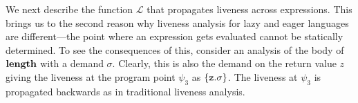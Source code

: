 \documentclass[9pt]{sigplanconf}
\newcommand{\comment}[1]{{\color{Myblue}{(#1)}}}
\begin{document}
We next  describe the function $\mathcal{L}$  that propagates liveness
across  expressions.   This brings  us  to  the  second reason why 
liveness analysis for lazy and eager languages are different---the
point  where  an  expression   gets  evaluated  cannot  be  statically
determined.   %
To see  the consequences of this, consider  an analysis  of the body  of $\mathbf{length}$  with a
demand $\sigma$.  Clearly, this is also the demand on the return value
$z$   giving  the   liveness  at   the  program   point   $\psi_3$  as
$\{\mbox{\tt z}.\sigma\}$.  The liveness at $\psi_3$ is propagated backwards as
in traditional liveness analysis.









\end{document}
